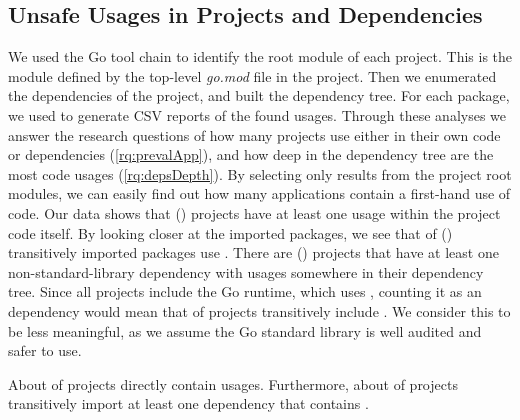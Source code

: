 
\subsection{Unsafe Usages in Projects and Dependencies}
\label{sec:eval:unsafewild}

We used the Go tool chain to identify the root module of each project. 
This is the module defined by the top-level \textit{go.mod} file in the project.
Then we enumerated the dependencies of the project, and built the dependency tree.
For each package, we used \toolUsage{} to generate CSV reports of the found \unsafe{} usages.
Through these analyses we answer the research questions of how many projects use \unsafe{} either in their own code or dependencies (\ref{rq:prevalApp}), and how deep in the dependency tree are the most \unsafe{} code usages (\ref{rq:depsDepth}). 
By selecting only results from the project root modules, we can easily find out how many applications contain a first-hand use of \unsafe{} code.
Our data shows that  () projects have at least one \unsafe{} usage within the project code itself.
By looking closer at the imported packages, we see that  of  () transitively imported packages use \unsafe{}. 
There are  () projects that have at least one non-standard-library dependency with \unsafe{} usages somewhere in their dependency tree.
Since all projects include the Go runtime, which uses \unsafe{}, counting it as an \unsafe{} dependency would mean that  of projects transitively include \unsafe{}.
We consider this to be less meaningful, as we assume the Go standard library is well audited and safer to use.

\begin{tcolorbox}[boxsep=1pt, enlarge top by=5pt, title=Answer to \ref{rq:prevalApp}]
About  of projects directly contain \unsafe{} usages.
Furthermore, about  of projects transitively import at least one dependency that contains \unsafe{}.
\end{tcolorbox}

